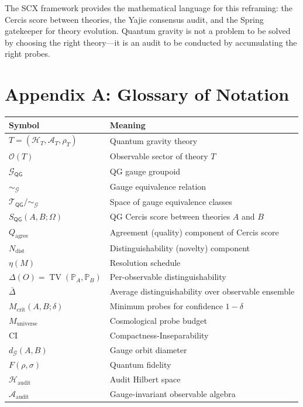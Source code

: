 \documentclass[12pt,a4paper]{article}
\theoremstyle{remark}
\newcommand{\Pbb}{\mathbb{P}}
\newcommand{\Obs}{\mathcal{O}}
\newcommand{\G}{\mathcal{G}}
\newcommand{\T}{\mathcal{T}}
\newcommand{\A}{\mathcal{A}}
\newcommand{\Hilb}{\mathcal{H}}
\newcommand{\SCX}{\textsf{SCX}}
\newcommand{\Yajie}{\textsf{Yajie}}
\newcommand{\Spring}{\textsf{Spring}}
\newcommand{\Cercis}{\textsf{Cercis}}
\newcommand{\CI}{\textsf{CI}}
\newcommand{\QG}{\textsf{QG}}
\DeclareMathOperator{\TV}{TV}
\begin{document}
The \SCX{} framework provides the mathematical language for this reframing: the \Cercis{} score between theories, the \Yajie{} consensus audit, and the \Spring{} gatekeeper for theory evolution. Quantum gravity is not a problem to be solved by choosing the right theory---it is an audit to be conducted by accumulating the right probes.


\section*{Appendix A: Glossary of Notation}
\label{app:notation}

\begin{table}[H]
\centering
\begin{tabular}{@{}ll@{}}
\toprule
\textbf{Symbol} & \textbf{Meaning} \\
\midrule
$T = (\Hilb_T, \A_T, \rho_T)$ & Quantum gravity theory \\
$\Obs(T)$ & Observable sector of theory $T$ \\
$\G_{\QG}$ & QG gauge groupoid \\
$\sim_{\G}$ & Gauge equivalence relation \\
$\T_{\QG} / \sim_{\G}$ & Space of gauge equivalence classes \\
$S_{\QG}(A, B; \Omega)$ & QG \Cercis{} score between theories $A$ and $B$ \\
$Q_{\text{agree}}$ & Agreement (quality) component of \Cercis{} score \\
$N_{\text{dist}}$ & Distinguishability (novelty) component \\
$\eta(M)$ & Resolution schedule \\
$\Delta(O) = \TV(\Pbb_A, \Pbb_B)$ & Per-observable distinguishability \\
$\bar{\Delta}$ & Average distinguishability over observable ensemble \\
$M_{\text{crit}}(A, B; \delta)$ & Minimum probes for confidence $1-\delta$ \\
$M_{\text{universe}}$ & Cosmological probe budget \\
\CI{} & Compactness-Inseparability \\
$d_{\G}(A, B)$ & Gauge orbit diameter \\
$F(\rho, \sigma)$ & Quantum fidelity \\
$\Hilb_{\text{audit}}$ & Audit Hilbert space \\
$\A_{\text{audit}}$ & Gauge-invariant observable algebra \\
\bottomrule
\end{tabular}
\end{table}
\end{document}
